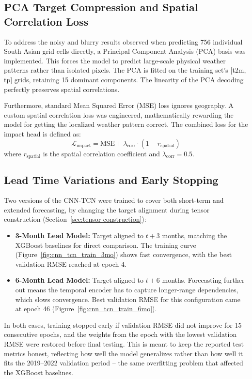 \subsection{PCA Target Compression and Spatial Correlation Loss}
To address the noisy and blurry results observed when predicting 756 individual South Asian grid cells directly, a Principal Component Analysis (PCA) basis was implemented. This forces the model to predict large-scale physical weather patterns rather than isolated pixels. The PCA is fitted on the training set's [t2m, tp] grids, retaining 15 dominant components. The linearity of the PCA decoding perfectly preserves spatial correlations.

Furthermore, standard Mean Squared Error (MSE) loss ignores geography. A custom spatial correlation loss was engineered, mathematically rewarding the model for getting the localized weather pattern correct. The combined loss for the impact head is defined as:
\begin{equation}
\mathcal{L}_{\text{impact}} = \text{MSE} + \lambda_{\text{corr}} \cdot (1 - r_{\text{spatial}})
\end{equation}
where $r_{\text{spatial}}$ is the spatial correlation coefficient and $\lambda_{\text{corr}} = 0.5$.


\subsection{Lead Time Variations and Early Stopping}
Two versions of the CNN-TCN were trained to cover both short-term and extended forecasting, by changing the target alignment during tensor construction (Section~\ref{sec:tensor-construction}):

\begin{itemize}
    \item \textbf{3-Month Lead Model:} Target aligned to $t+3$ months, matching the XGBoost baselines for direct comparison. The training curve (Figure~\ref{fig:cnn_tcn_train_3mo}) shows fast convergence, with the best validation RMSE reached at epoch 4.
    \item \textbf{6-Month Lead Model:} Target aligned to $t+6$ months. Forecasting further out means the temporal encoder has to capture longer-range dependencies, which slows convergence. Best validation RMSE for this configuration came at epoch 46 (Figure~\ref{fig:cnn_tcn_train_6mo}).
\end{itemize}

In both cases, training stopped early if validation RMSE did not improve for 15 consecutive epochs, and the weights from the epoch with the lowest validation RMSE were restored before final testing. This is meant to keep the reported test metrics honest, reflecting how well the model generalizes rather than how well it fits the 2019--2022 validation period -- the same overfitting problem that affected the XGBoost baselines.

